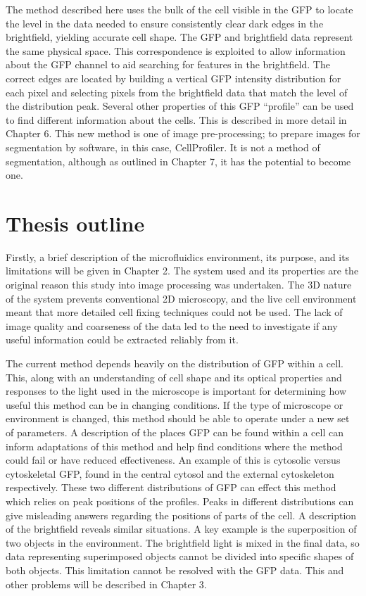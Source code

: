 The method described here uses the bulk of the cell visible in the GFP to locate the level in the data needed to ensure consistently clear dark edges in the brightfield, yielding accurate cell shape. The GFP and brightfield data represent the same physical space. This correspondence is exploited to allow information about the GFP channel to aid searching for features in the brightfield. The correct edges are located by building a vertical GFP intensity distribution for each pixel and selecting pixels from the brightfield data that match the level of the distribution peak. Several other properties of this GFP ``profile'' can be used to find different information about the cells. This is described in more detail in Chapter 6. This new method is one of image pre-processing; to prepare images for segmentation by software, in this case, CellProfiler. It is not a method of segmentation, although as outlined in Chapter 7, it has the potential to become one.

\section{Thesis outline}

Firstly, a brief description of the microfluidics environment, its purpose, and its limitations will be given in Chapter 2. The system used and its properties are the original reason this study into image processing was undertaken. The 3D nature of the system prevents conventional 2D microscopy, and the live cell environment meant that more detailed cell fixing techniques could not be used. The lack of image quality and coarseness of the data led to the need to investigate if any useful information could be extracted reliably from it.

The current method depends heavily on the distribution of GFP within a cell. This, along with an understanding of cell shape and its optical properties and responses to the light used in the microscope is important for determining how useful this method can be in changing conditions. If the type of microscope or environment is changed, this method should be able to operate under a new set of parameters. A description of the places GFP can be found within a cell can inform adaptations of this method and help find conditions where the method could fail or have reduced effectiveness. An example of this is cytosolic versus cytoskeletal GFP, found in the central cytosol and the external cytoskeleton respectively. These two different distributions of GFP can effect this method which relies on peak positions of the profiles. Peaks in different distributions can give misleading answers regarding the positions of parts of the cell. A description of the brightfield reveals similar situations. A key example is the superposition of two objects in the environment. The brightfield light is mixed in the final data, so data representing superimposed objects cannot be divided into specific shapes of both objects. This limitation cannot be resolved with the GFP data. This and other problems will be described in Chapter 3.


